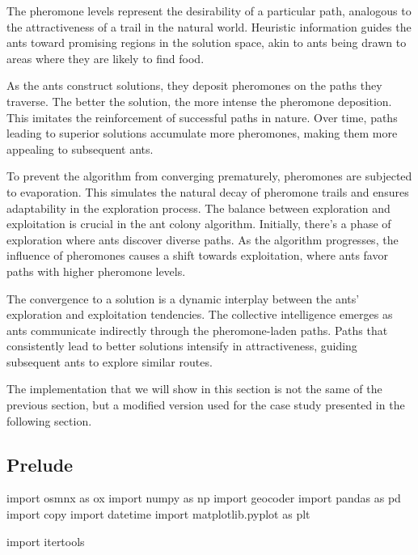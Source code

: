 \documentclass[titlepage]{article}
\begin{document}
The pheromone levels represent the desirability of a particular path, analogous to the attractiveness of a trail in the natural world. Heuristic information guides the ants toward promising regions in the solution space, akin to ants being drawn to areas where they are likely to find food.

As the ants construct solutions, they deposit pheromones on the paths they traverse. The better the solution, the more intense the pheromone deposition. This imitates the reinforcement of successful paths in nature. Over time, paths leading to superior solutions accumulate more pheromones, making them more appealing to subsequent ants.

To prevent the algorithm from converging prematurely, pheromones are subjected to evaporation. This simulates the natural decay of pheromone trails and ensures adaptability in the exploration process. The balance between exploration and exploitation is crucial in the ant colony algorithm. Initially, there's a phase of exploration where ants discover diverse paths. As the algorithm progresses, the influence of pheromones causes a shift towards exploitation, where ants favor paths with higher pheromone levels.

The convergence to a solution is a dynamic interplay between the ants' exploration and exploitation tendencies. The collective intelligence emerges as ants communicate indirectly through the pheromone-laden paths. Paths that consistently lead to better solutions intensify in attractiveness, guiding subsequent ants to explore similar routes.

The implementation that we will show in this section is not the same of the previous section, but a modified version used for the case study presented in the following section.

\subsection{Prelude}
\begin{python}
import osmnx as ox
import numpy as np
import geocoder
import pandas as pd
import copy
import datetime
import matplotlib.pyplot as plt

import itertools
\end{python}
\end{document}
